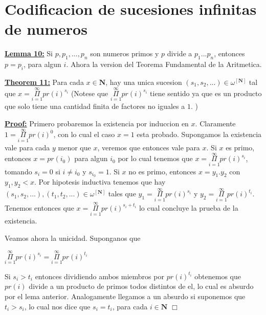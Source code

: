 \section{Codificacion de sucesiones infinitas de numeros}

  \textbf{\underline{Lemma 10:}} Si \(p,p_{1},...,p_{n}\) son numeros primos y \(p\) divide a \(p_{1}...p_{n}\), entonces \(p=p_{i}\), para algun \(i\).
Ahora la version del Teorema Fundamental de la Aritmetica.

  \textbf{\underline{Theorem 11:}} Para cada \(x\in \mathbf{N}\), hay una unica sucesion \((s_{1},s_{2},...)\in \omega ^{\left[ \mathbf{N}\right] }\) tal que
\(\displaystyle x=\underset{i=1}{\overset{\infty }{\Pi }}pr(i)^{s_{i}} \)
(Notese que \(\underset{i=1}{\overset{\infty }{\Pi }}pr(i)^{s_{i}}\) tiene sentido ya que es un producto que solo tiene una cantidad finita de factores no iguales a \(1\). )

\textbf{\underline{Proof:}} Primero probaremos la existencia por induccion en \(x\). Claramente \(1= \underset{i=1}{\overset{\infty }{\Pi }}pr(i)^{0}\), con lo cual el caso \(x=1\) esta probado. Supongamos la existencia vale para cada \(y\) menor que \(x\), veremos que entonces vale para \(x\). Si \(x\) es primo, entonces \(x=pr(i_{0})\) para algun \(i_{0}\) por lo cual tenemos que \(x=\underset{i=1}{\overset{\infty }{\Pi }}pr(i)^{s_{i}}\), tomando \(s_{i}=0\) si \(i\neq i_{0}\) y \(s_{i_{0}}=1\). Si \(x\) no es primo, entonces \(x=y_{1}.y_{2}\) con \(y_{1},y_{2}< x\). Por hipotesis inductiva tenemos que hay \((s_{1},s_{2},...),(t_{1},t_{2},...)\in \omega ^{\left[ \mathbf{N}\right] }\) tales que \(y_{1}=\underset{i=1}{\overset {\infty }{\Pi }}pr(i)^{s_{i}}\) y \(y_{2}=\underset{i=1}{\overset{\infty }{\Pi }}pr(i)^{t_{i}}\). Tenemos entonces que \(x=\underset{i=1}{\overset{\infty }{ \Pi }}pr(i)^{s_{i}+t_{i}}\) lo cual concluye la prueba de la existencia.

Veamos ahora la unicidad. Suponganos que

\(\displaystyle \underset{i=1}{\overset{\infty }{\Pi }}pr(i)^{s_{i}}=\underset{i=1}{\overset{ \infty }{\Pi }}pr(i)^{t_{i}} \)

Si \(s_{i} >t_{i}\) entonces dividiendo ambos miembros por \(pr(i)^{t_{i}}\) obtenemos que \(pr(i)\) divide a un producto de primos todos distintos de el, lo cual es absurdo por el lema anterior. Analogamente llegamos a un absurdo si suponemos que \(t_{i} >s_{i}\), lo cual nos dice que \(s_{i}=t_{i}\), para cada \(i\in \mathbf{N}\) \(\Box\)

